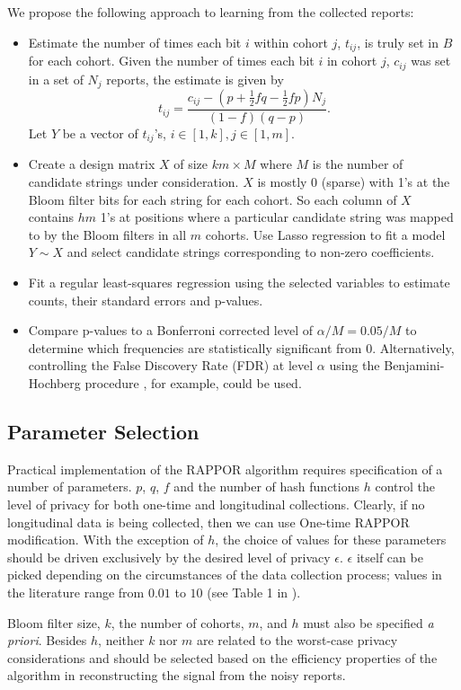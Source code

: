 \documentclass{sig-alternate-2013}
\newcommand\RAPPOR{{RAPPOR}}
\begin{document}
We propose the following approach to learning from the collected reports:
\begin{itemize}
\item Estimate the number of times each bit $i$ within cohort $j$, $t_{ij}$, is truly set in $B$ for each cohort. Given the number of times each bit $i$ in cohort $j$, $c_{ij}$ was set in a set of $N_j$ reports, the estimate is given by
$$
t_{ij} = \frac{c_{ij} - (p + \frac{1}{2}fq - \frac{1}{2}fp)N_j}{(1 - f)(q - p)}.
$$
Let $Y$ be a vector of $t_{ij}$'s, $i \in [1, k], j \in[1, m]$.
\item Create a design matrix $X$ of size $km \times M$ where $M$ is the number of candidate strings under consideration. $X$ is mostly 0 (sparse) with 1's at the Bloom filter bits for each string for each cohort. So each column of $X$ contains $hm$ 1's at positions where a particular candidate string was mapped to by the Bloom filters in all $m$ cohorts. Use Lasso \citep{lasso} regression to fit a model $Y \sim X$ and select candidate strings corresponding to non-zero coefficients.
\item Fit a regular least-squares regression using the selected variables to estimate counts, their standard errors and p-values.
\item Compare p-values to a Bonferroni corrected level of $\alpha / M = 0.05 / M$ to determine which frequencies are statistically significant from 0. Alternatively, controlling the False Discovery Rate (FDR) at level $\alpha$ using the Benjamini-Hochberg procedure \cite{Benjamini1995}, for example, could be used.
\end{itemize}


\subsection{Parameter Selection}
Practical implementation of the \RAPPOR{} algorithm requires specification of a number of parameters. $p$, $q$, $f$ and the number of hash functions $h$ control the level of privacy for both one-time and longitudinal collections. Clearly, if no longitudinal data is being collected, then we can use One-time \RAPPOR{} modification. With the exception of $h$, the choice of values for these parameters should be driven exclusively by the desired level of privacy $\epsilon$. $\epsilon$ itself can be picked depending on the circumstances of the data collection process; values in the literature range from $0.01$ to $10$ (see Table 1 in \cite{HsuGHKNPR14}).

Bloom filter size, $k$, the number of cohorts, $m$, and $h$ must also be specified \emph{a priori}. Besides $h$, neither $k$ nor $m$ are related to the worst-case privacy considerations and should be selected based on the efficiency properties of the algorithm in reconstructing the signal from the noisy reports.
\end{document}
